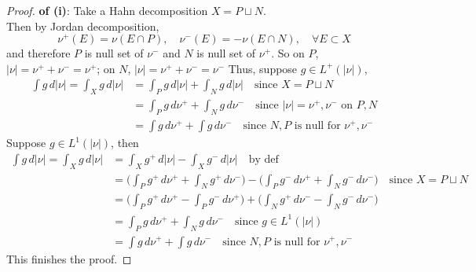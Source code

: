 \documentclass[lang=cn,11pt]{elegantbook}
\begin{document}
\begin{proof}
    \textbf{of (i)}:
    Take a Hahn decomposition $X = P \sqcup N $.\\
    Then by Jordan decomposition, \[
    \nu^+ (E) = \nu(E \cap P), \quad     \nu^- (E) = -\nu(E \cap N),\quad  \forall E \subset X
    \]
    and therefore $P$ is null set of $\nu^-$ and $N$ is null set of $\nu^+$. So on $P$,  $|\nu| = \nu^+ + \nu^-  = \nu^+$; on $N$,  $|\nu| = \nu^+ + \nu^-  = \nu^-$
    Thus, suppose $g\in L^+(|\nu|)$,  \begin{align*}
        \int g \, d |\nu|= \int _X g\, d|\nu|   & =  \int_P g\, d |\nu| + \int_N g\, d |\nu|\quad \text{since } X = P \sqcup N \\
        & = \int_P g\, d \nu^+ + \int_N g\, d \nu^-  \quad \text{since } |\nu| = \nu^+,\nu^- \text{ on }P,N    \\
        & = \int g\, d \nu^+ + \int g\, d \nu^- \quad \text{since }N,P \text{ is null for } \nu^+, \nu^-
    \end{align*}
    Suppose $g\in L^1(|\nu|)$, then  \begin{align*}
        \int g \, d |\nu|= \int _X g\, d|\nu|   & =   \int_X g^+ \, d|\nu| -  \int_X g^-\, d|\nu| \quad \text{by def}  \\
        & =\bigg( \int_P g^+\, d \nu^+ + \int_N g^+\, d \nu^-\bigg) -  \bigg( \int_P g^-\, d \nu^+ + \int_N g^-\, d \nu^-\bigg)\quad \text{since } X = P \sqcup N \\
        & = ( \int_P g^+\, d \nu^+  -  \int_P g^-\, d \nu^+\bigg) + \bigg( \int_N g^+\, d \nu^-- \int_N g^-\, d \nu^-\bigg) \\
        & = \int_P g \, d\nu^+  +  \int_N g \, d\nu^- \quad \text{since $g\in L^1(|\nu|)$} \\
        & =\int g \, d\nu^+  +  \int g \, d\nu^- \quad \text{since }N,P \text{ is null for } \nu^+, \nu^-
    \end{align*}
    This finishes the proof.
\end{proof}
\end{document}
